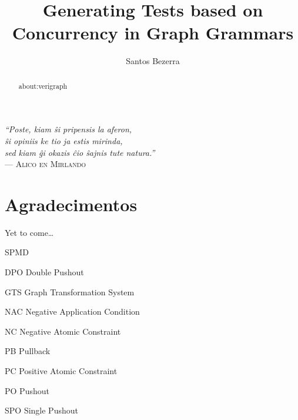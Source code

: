 \documentclass[ppgc,diss,english,openright]{iiufrgs}
\title{Generating Tests based on Concurrency in Graph Grammars}
\author{Santos Bezerra}{Jonas}
\theoremstyle{plain}
\theoremstyle{definition}
\begin{document}
  \maketitle
  \clearpage

  \clearpage
  \begin{flushright}
    \mbox{}\vfill
    {\sffamily\itshape
    ``Poste, kiam \^si pripensis la aferon,\\
    \^si opiniis ke tio ja estis mirinda,\\
    sed kiam \^gi okazis \^cio \^sajnis tute natura.''\\}
    --- \textsc{Alico en Mirlando}
  \end{flushright}

  \chapter*{Agradecimentos}
  Yet to come\ldots
  
  \begin{abstract}
    about:verigraph
  \end{abstract}

  \begin{listofabbrv}{SPMD}
          \item[DPO] Double Pushout
          \item[GTS] Graph Transformation System
          \item[NAC] Negative Application Condition
          \item[NC] Negative Atomic Constraint
          \item[PB] Pullback
          \item[PC] Positive Atomic Constraint
          \item[PO] Pushout
          \item[SPO] Single Pushout
  \end{listofabbrv}


  \listoffigures
  \tableofcontents

  
  
  
% 
  
  
  
  
\end{document}
